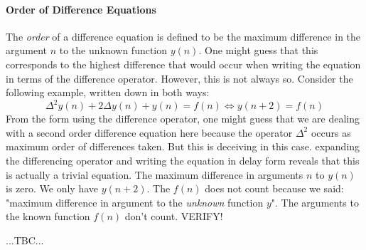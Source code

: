 \paragraph{Order of Difference Equations}
The \emph{order} of a difference equation is defined to be the maximum difference in the argument $n$ to the unknown function $y(n)$. One might guess that this corresponds to the highest difference that would occur when writing the equation in terms of the difference operator. However, this is not always so. Consider the following example, written down in both ways:
\begin{equation}
 \Delta^2 y(n) + 2 \Delta y(n) + y(n) = f(n) 
 \Leftrightarrow
 y(n+2) = f(n)
\end{equation}
From the form using the difference operator, one might guess that we are dealing with a second order difference equation here because the operator $\Delta^2$ occurs as maximum order of differences taken. But this is deceiving in this case. expanding the differencing operator and writing the equation in delay form reveals that this is actually a trivial equation. The maximum difference in arguments $n$ to $y(n)$ is zero. We only have $y(n+2)$. The $f(n)$ does not count because we said: "maximum difference in argument to the \emph{unknown} function $y$". The arguments to the known function $f(n)$ don't count. VERIFY! 


...TBC...



